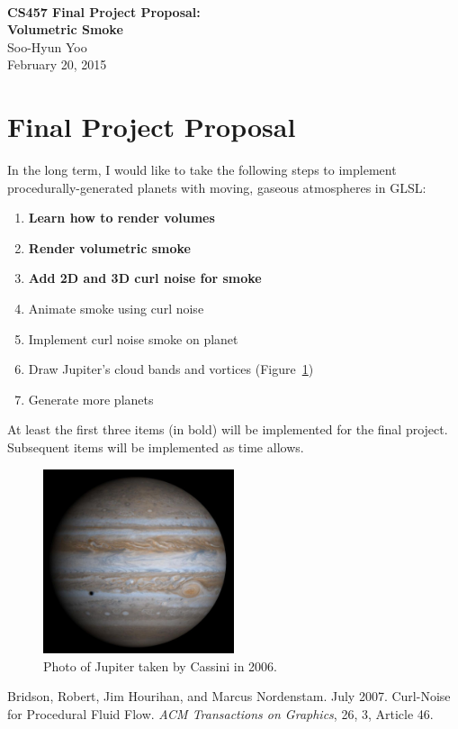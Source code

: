 \documentclass[12pt,letterpaper]{article}
\begin{document}
\fancyfoot{}
\begin{center}
  \hfill \\
  \vspace{4in}
  {\bf\Huge CS457 Final Project Proposal:\\Volumetric Smoke\\}
  \vspace{2in}
  {\Large Soo-Hyun Yoo \\ February 20, 2015}
\end{center}

\newpage
\fancyhead{}

\section*{Final Project Proposal}

In the long term, I would like to take the following steps to implement
procedurally-generated planets with moving, gaseous atmospheres in GLSL:

\begin{enumerate}
  \item {\bf Learn how to render volumes}
  \item {\bf Render volumetric smoke}
  \item {\bf Add 2D and 3D curl noise \cite{bridson07} for smoke}
  \item Animate smoke using curl noise
  \item Implement curl noise smoke on planet
  \item Draw Jupiter's cloud bands and vortices (Figure~\ref{fig:jupiter})
  \item Generate more planets
\end{enumerate}

At least the first three items (in bold) will be implemented for the final
project. Subsequent items will be implemented as time allows.

\begin{figure}[!h]
  \centering
  \includegraphics[width=0.5\textwidth]{img/jupiter.jpg}
  \caption{Photo of Jupiter taken by Cassini in 2006.}
  \label{fig:jupiter}
\end{figure}


\begin{thebibliography}{9}
   Bridson, Robert, Jim Hourihan, and Marcus Nordenstam. July 2007.
    Curl-Noise for Procedural Fluid Flow. {\it ACM Transactions on Graphics},
    26, 3, Article 46.
\end{thebibliography}
\end{document}
